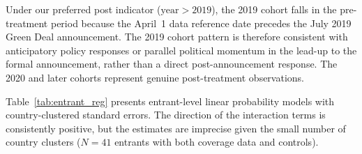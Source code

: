 \documentclass[12pt,a4paper]{article}
\begin{document}
Under our preferred post indicator ($\text{year} > 2019$), the 2019 cohort falls in the pre-treatment period because the April~1 data reference date precedes the July 2019 Green Deal announcement. The 2019 cohort pattern is therefore consistent with anticipatory policy responses or parallel political momentum in the lead-up to the formal announcement, rather than a direct post-announcement response. The 2020 and later cohorts represent genuine post-treatment observations.

Table~\ref{tab:entrant_reg} presents entrant-level linear probability models with country-clustered standard errors. The direction of the interaction terms is consistently positive, but the estimates are imprecise given the small number of country clusters ($N=41$ entrants with both coverage data and controls).
\end{document}
